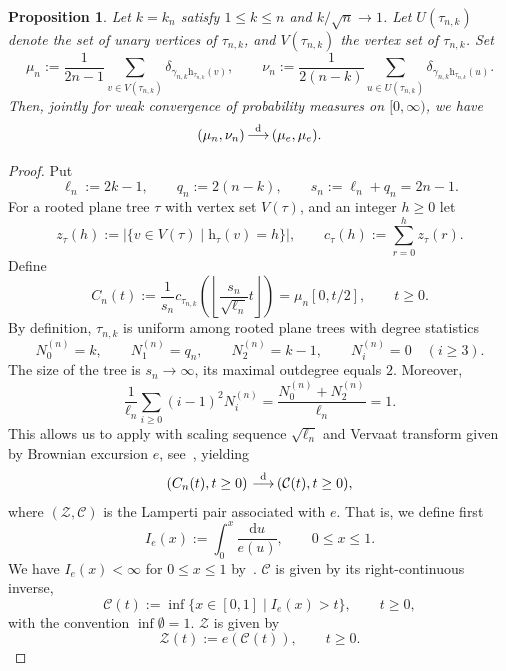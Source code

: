 \documentclass[english,11pt]{smfart}
\newcommand{\convdis}{\,{\buildrel \mathrm{d} \over \longrightarrow}\,}
\newcommand{\he}{\mathrm{h}}
\newtheorem{proposition}[theorem]{Proposition}
\numberwithin{equation}{section}
\begin{document}
\begin{proposition}\label{pro:top-tree-profile}
	Let  $k=k_n$ satisfy $1 \le k \le n$ and $k/\sqrt{n} \to 1$. Let $U(\tau_{n,k})$ denote the set of unary vertices of $\tau_{n,k}$, and $V(\tau_{n,k})$ the vertex set of $\tau_{n,k}$. Set
	\[
		\mu_n := \frac{1}{2n-1}\sum_{v\in V(\tau_{n,k})} \delta_{\gamma_{n,k}\he_{\tau_{n,k}}(v)}, \qquad
		\nu_n :=\frac{1}{2(n-k)}\sum_{u\in U(\tau_{n,k})} \delta_{\gamma_{n,k}\he_{\tau_{n,k}}(u)}.
	\]
	Then, jointly for weak convergence of probability measures on $[0,\infty)$, we have
	\[
		(\mu_n,\nu_n) \convdis (\mu_e,\mu_e).
	\]
\end{proposition}
\begin{proof}
	Put
	\[
		\ell_n:=2k-1, \qquad q_n:=2(n-k), \qquad s_n:=\ell_n+q_n=2n-1.
	\]
	For a rooted plane tree $\tau$ with vertex set $V(\tau)$, and an integer $h \ge 0$  let
	\[
		z_\tau(h) := |\{v\in V(\tau) \mid \he_{\tau}(v) = h\}|, \qquad c_\tau(h):=\sum_{r=0}^h z_\tau(r).
	\]
	Define
	\[
		C_n(t) := \frac{1}{s_n} c_{\tau_{n,k}}\left(\left\lfloor\frac{s_n}{\sqrt{\ell_n}}t\right\rfloor\right) = \mu_n[0, t/2], \qquad t \ge 0.
	\]
	By definition, $\tau_{n,k}$ is uniform among rooted plane trees with degree
	statistics
	\[
		N_0^{(n)}=k, \qquad N_1^{(n)}=q_n, \qquad N_2^{(n)}=k-1, \qquad N_i^{(n)}=0\quad(i\ge 3).
	\]
	The size of the tree is $s_n \to \infty$, its maximal outdegree equals $2$. Moreover,
	\[
		\frac{1}{\ell_n} \sum_{i\ge 0}(i-1)^2 N_i^{(n)} = \frac{N_0^{(n)} + N_2^{(n)}}{\ell_n}=1.
	\]
	This allows us to apply \cite[Prop.~1, Prop.~3, Thm.~1]{angtuncio2020profiletreesgivendegree} with scaling
	sequence $\sqrt{\ell_n}$ and Vervaat transform given by Brownian excursion $e$, see~\cite{zbMATH03608918}, yielding
	\begin{align}
		\label{eq:cumulativeprofile}
		\left(C_n(t), t\ge 0\right) \convdis (\mathcal C(t), t\ge 0),
	\end{align}
	where $(\mathcal{Z},\mathcal{C})$ is the Lamperti pair associated with $e$. That is, we define first
	\[
		I_e(x) :=\int_0^x \frac{\mathrm{d}u}{e(u)}, \qquad 0\le x \le 1.
	\]
	We have  $I_e(x)< \infty$ for $0 \le x \le 1$ by~\cite[Prop.~3]{angtuncio2020profiletreesgivendegree}. $\mathcal{C}$ is given by  its right-continuous inverse,
	\[
		\mathcal C(t) := \inf\bigl\{x\in[0,1] \mid I_e(x) > t \bigr\},\qquad t\ge0,
	\]
	with the convention $\inf\emptyset=1$. $\mathcal{Z}$ is given by
	\[
		\mathcal{Z}(t) := e(\mathcal{C}(t)), \qquad t \ge 0.
	\]
	

\end{proof}
\end{document}
